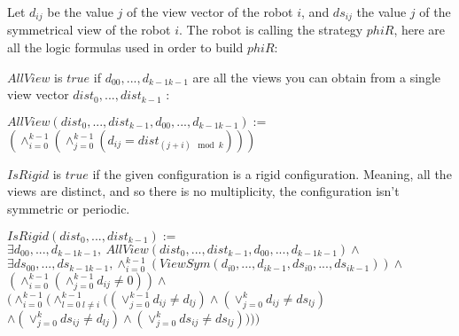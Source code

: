 \documentclass{article}
\begin{document}

Let $d_{ij}$ be the value $j$ of the view vector of the robot $i$, and $ds_{ij}$ the value $j$ of the symmetrical 
view of the robot $i$.
The robot is calling the strategy $phiR$, here are all the logic formulas used in order to build $phiR$:

$AllView$ is $true$ if $d_{00}, ...,d_{k-1k-1}$ are all the views you can obtain from a single view vector $dist_{0}, ...,dist_{k-1}$ :

\begin{center}
    
$AllView(dist_{0}, ...,dist_{k-1}, d_{00}, ...,d_{k-1k-1}):=$\\
$(\land_{i=0}^{k-1} (\land_{j=0}^{k-1} (d_{ij} = dist_{(j+i) \mod{k}}) ) )$
\end{center}

$IsRigid$ is $true$ if the given configuration is a rigid configuration. Meaning, all the views are distinct, and so there is no multiplicity, the configuration isn't symmetric or periodic.

\begin{center}

$IsRigid(dist_{0}, ...,dist_{k-1}):=$\\
$\exists d_{00}, ...,d_{k-1k-1},\ AllView(dist_{0}, ...,dist_{k-1}, d_{00}, ...,d_{k-1k-1})\land$\\
$\exists ds_{00}, ...,ds_{k-1k-1}, \land_{i=0}^{k-1} (ViewSym(d_{i0}, ..., d_{ik-1}, ds_{i0}, ..., ds_{ik-1}))\land$\\
$(\land_{i=0}^{k-1}(\land_{j=0}^{k-1}d_{ij}\not=0))\land $\\%
$( \land_{i=0}^{k-1}(
\land_{l=0\ l\not=i}^{k-1}(
(\lor_{j=0}^{k-1}d_{ij} \not= d_{lj})
\land (\lor_{j=0}^{k}d_{ij} \not= ds_{lj})$\\
$\land (\lor_{j=0}^{k}ds_{ij} \not= d_{lj})
\land (\lor_{j=0}^{k}ds_{ij} \not= ds_{lj})
) ))$\\%
\end{center}
\end{document}
